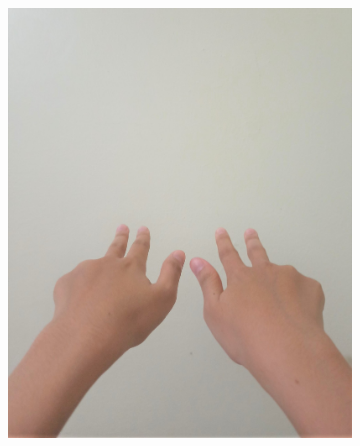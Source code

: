 \documentclass[conference]{IEEEtran}
\begin{document}
\begin{figure} [h]
\begin{center}
\begin{subfigure}[t]{0.11\textwidth}
			\includegraphics[width=\textwidth]{img/pola3b.jpg}
			\caption{\label{fig:gs3b}}
		\end{subfigure}
		\hspace{0.1em}
		\begin{subfigure}[t]{0.11\textwidth}

\end{subfigure}
\end{center}
\end{figure}
\end{document}
